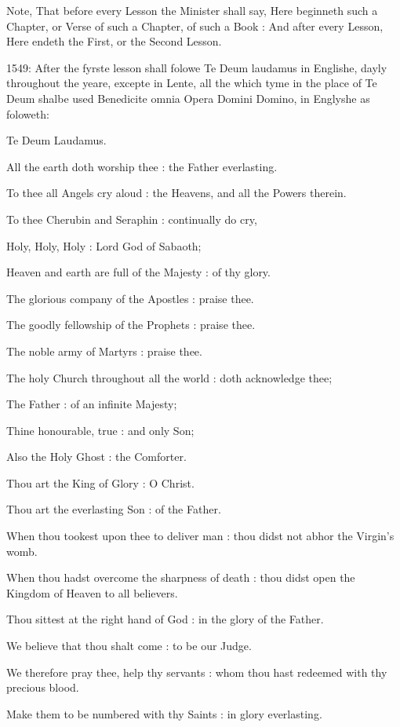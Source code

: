 Note, That before every Lesson the Minister shall say, Here beginneth such a Chapter, or Verse of such a Chapter, of such a Book : And after every Lesson, Here endeth the First, or the Second Lesson.

1549: After the fyrste lesson shall folowe Te Deum laudamus in Englishe, dayly throughout the yeare, excepte in Lente, all the which tyme in the place of Te Deum shalbe used Benedicite omnia Opera Domini Domino, in Englyshe as foloweth:

Te Deum Laudamus.

All the earth doth worship thee : the Father everlasting.

To thee all Angels cry aloud : the Heavens, and all the Powers therein.

To thee Cherubin and Seraphin : continually do cry,

Holy, Holy, Holy : Lord God of Sabaoth;

Heaven and earth are full of the Majesty : of thy glory.

The glorious company of the Apostles : praise thee.

The goodly fellowship of the Prophets : praise thee.

The noble army of Martyrs : praise thee.

The holy Church throughout all the world : doth acknowledge thee;

The Father : of an infinite Majesty;

Thine honourable, true : and only Son;

Also the Holy Ghost : the Comforter.

Thou art the King of Glory : O Christ.

Thou art the everlasting Son : of the Father.

When thou tookest upon thee to deliver man : thou didst not abhor the Virgin's womb.

When thou hadst overcome the sharpness of death : thou didst open the Kingdom of Heaven to all believers.

Thou sittest at the right hand of God : in the glory of the Father.

We believe that thou shalt come : to be our Judge.

We therefore pray thee, help thy servants : whom thou hast redeemed with thy precious blood.

Make them to be numbered with thy Saints : in glory everlasting.

